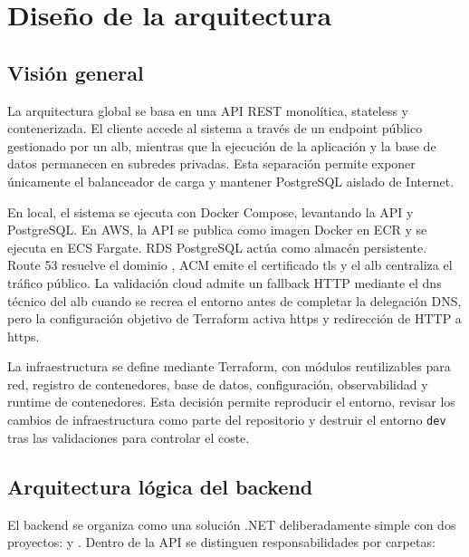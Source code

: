 \chapter{Diseño de la arquitectura}
\label{chap:arquitectura}

\section{Visión general}
\label{sec:vision-general-arquitectura}

La arquitectura global se basa en una API REST monolítica, \gls{stateless} y contenerizada. El cliente accede al sistema a través de un endpoint público gestionado por un \acrshort{alb}, mientras que la ejecución de la aplicación y la base de datos permanecen en subredes privadas. Esta separación permite exponer únicamente el balanceador de carga y mantener PostgreSQL aislado de Internet.

En local, el sistema se ejecuta con Docker Compose, levantando la API y PostgreSQL. En AWS, la API se publica como imagen Docker en ECR y se ejecuta en ECS Fargate. RDS PostgreSQL actúa como almacén persistente. Route 53 resuelve el dominio , ACM emite el certificado \acrshort{tls} y el \acrshort{alb} centraliza el tráfico público. La validación cloud admite un fallback HTTP mediante el \acrshort{dns} técnico del \acrshort{alb} cuando se recrea el entorno antes de completar la delegación DNS, pero la configuración objetivo de Terraform activa \acrshort{https} y redirección de HTTP a \acrshort{https}.

La infraestructura se define mediante Terraform, con módulos reutilizables para red, registro de contenedores, base de datos, configuración, observabilidad y runtime de contenedores. Esta decisión permite reproducir el entorno, revisar los cambios de infraestructura como parte del repositorio y destruir el entorno \texttt{dev} tras las validaciones para controlar el coste.

\section{Arquitectura lógica del backend}
\label{sec:arquitectura-logica-backend}

El backend se organiza como una solución .NET deliberadamente simple con dos proyectos:  y . Dentro de la API se distinguen responsabilidades por carpetas:

